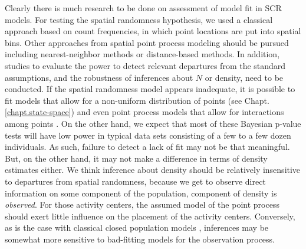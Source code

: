 Clearly there is much research to be done on assessment of model fit
in SCR models. For testing the spatial randomness hypothesis, we used
a classical approach based on count frequencies, in which point
locations are put into spatial bins. Other approaches from spatial
point process modeling should be pursued including nearest-neighbor
methods or distance-based methods. In addition, studies to evaluate
the power to detect relevant departures from the standard
assumptions, and the robustness of inferences about $N$ or density,
need to be conducted.  If the spatial randomness model appears
inadequate, 
it is possible to fit models that allow for a non-uniform
distribution of points (see Chapt. \ref{chapt.state-space}) and even
point process models that allow for interactions among points
\citep{reich_etal:2012}. On the other hand, we expect that most of
these Bayesian p-value tests will have low power in typical data
sets consisting of a few to a few dozen individuals. As such, failure
to detect a lack of fit may not be that meaningful. But, on the other
hand, it may not make a difference in terms of density estimates
either.  We think inference about density should be relatively
insensitive to departures from spatial randomness, because we get to
observe direct information on some component of the population,
component of density is {\it observed}. For those activity
centers, the assumed model of the point process should exert little
influence on 
the placement of the activity centers.  Conversely, as is the case
with classical closed population models \citep{otis_etal:1978,dorazio_royle:2003,
  link:2003}, inferences may be somewhat more sensitive to
bad-fitting models for the observation process.












